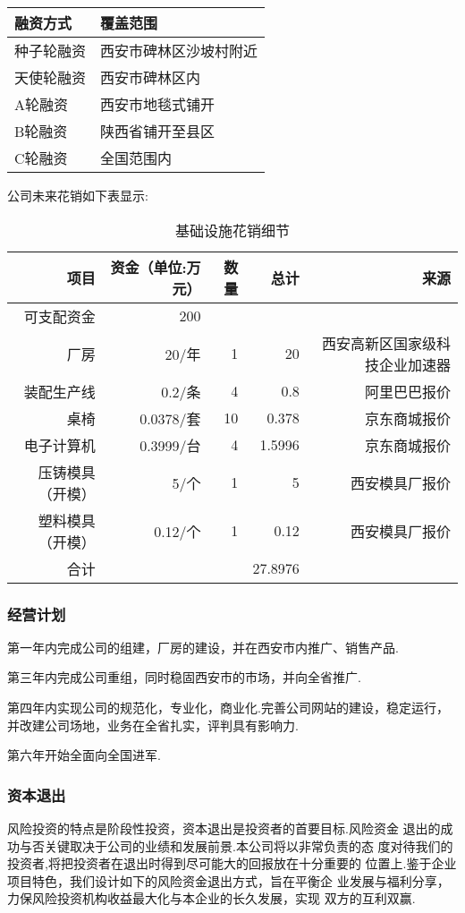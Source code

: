 \begin{longtable}{l|l}
\hline
融资方式  &  覆盖范围  \\
\hline
种子轮融资  &  西安市碑林区沙坡村附近  \\
天使轮融资  &  西安市碑林区内  \\
A轮融资  &  西安市地毯式铺开   \\
B轮融资  &  陕西省铺开至县区  \\
C轮融资  &  全国范围内  \\
\hline
\end{longtable}

公司未来花销如下表显示:

\begin{table}[htbp]
  \centering
  \caption{基础设施花销细节}
    \begin{tabular}{|rrrrr|}
    \toprule
    项目 & 资金（单位:万元） & 数量 & 总计 & 来源 \\
    \hline
    可支配资金 & 200   &       &       &  \\
    厂房    & 20/年  & 1     & 20    & 西安高新区国家级科技企业加速器 \\
    装配生产线 & 0.2/条 & 4     & 0.8   & 阿里巴巴报价 \\
    桌椅    & 0.0378/套 & 10    & 0.378 & 京东商城报价 \\
    电子计算机 & 0.3999/台 & 4     & 1.5996 & 京东商城报价 \\
    压铸模具（开模） & 5/个   & 1     & 5     & 西安模具厂报价 \\
    塑料模具（开模） & 0.12/个 & 1     & 0.12  & 西安模具厂报价 \\
    合计    &       &       & 27.8976 &  \\
    \bottomrule
    \end{tabular}%
  \label{tab:addlabel}%
\end{table}%

\subsubsection{经营计划}
第一年内完成公司的组建，厂房的建设，并在西安市内推广、销售产品.

第三年内完成公司重组，同时稳固西安市的市场，并向全省推广.

第四年内实现公司的规范化，专业化，商业化.完善公司网站的建设，稳定运行，并改建公司场地，业务在全省扎实，评判具有影响力.

第六年开始全面向全国进军.


\subsubsection{资本退出}
风险投资的特点是阶段性投资，资本退出是投资者的首要目标.风险资金 退出的成功与否关键取决于公司的业绩和发展前景.本公司将以非常负责的态 度对待我们的投资者,将把投资者在退出时得到尽可能大的回报放在十分重要的 位置上.鉴于企业项目特色，我们设计如下的风险资金退出方式，旨在平衡企 业发展与福利分享，力保风险投资机构收益最大化与本企业的长久发展，实现 双方的互利双赢.

